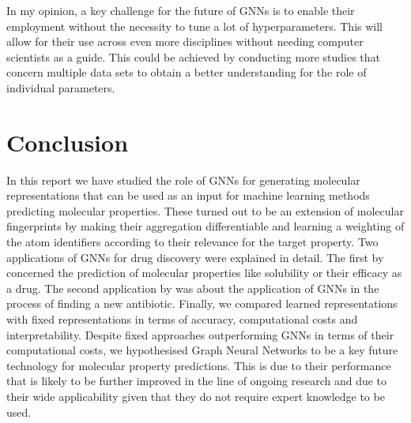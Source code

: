 In my opinion, a key challenge for the future of GNNs is to enable their employment without the necessity to tune a lot of hyperparameters. This will allow for their use across even more disciplines without needing computer scientists as a guide. This could be achieved by conducting more studies that concern multiple data sets to obtain a better understanding for the role of individual parameters.  
\section{Conclusion}
In this report we have studied the role of GNNs for generating molecular representations that can be used as an input for machine learning methods predicting molecular properties. These turned out to be an extension of molecular fingerprints by making their aggregation differentiable and learning a weighting of the atom identifiers according to their relevance for the target property.
Two applications of GNNs for drug discovery were explained in detail. The first by \cite{duvenaud2015convolutional} concerned the prediction of molecular properties like solubility or their efficacy as a drug. The second application by \cite{STOKES2020688} was about the application of GNNs in the process of finding a new antibiotic. 
Finally, we compared learned representations with fixed representations in terms of accuracy, computational costs and interpretability. Despite fixed approaches outperforming GNNs in terms of their computational costs, we hypothesised Graph Neural Networks to be a key future technology for molecular property predictions. This is due to their performance that is likely to be further improved in the line of ongoing research and due to their wide applicability given that they do not require expert knowledge to be used. 